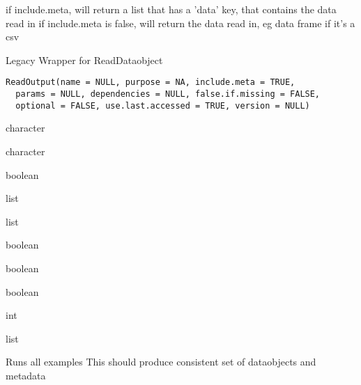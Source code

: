 \documentclass[a4paper]{book}
\begin{document}
%
\begin{Value}
if include.meta, will return a list that has a 'data' key, that contains the data read in if include.meta is false, will return the data read in, eg data frame if it's a csv
\end{Value}
%
\begin{Description}\relax
Legacy Wrapper for ReadDataobject
\end{Description}
%
\begin{Usage}
\begin{verbatim}
ReadOutput(name = NULL, purpose = NA, include.meta = TRUE,
  params = NULL, dependencies = NULL, false.if.missing = FALSE,
  optional = FALSE, use.last.accessed = TRUE, version = NULL)
\end{verbatim}
\end{Usage}
%
\begin{Arguments}
\begin{ldescription}
\item[\code{name}] character

\item[\code{purpose}] character

\item[\code{include.meta}] boolean

\item[\code{params}] list

\item[\code{dependencies}] list

\item[\code{false.if.missing}] boolean

\item[\code{optional}] boolean

\item[\code{use.last.accessed}] boolean

\item[\code{version}] int
\end{ldescription}
\end{Arguments}
%
\begin{Value}
list
\end{Value}
%
\begin{Description}\relax
Runs all examples
This should produce consistent set of dataobjects and metadata
\end{Description}
\end{document}
